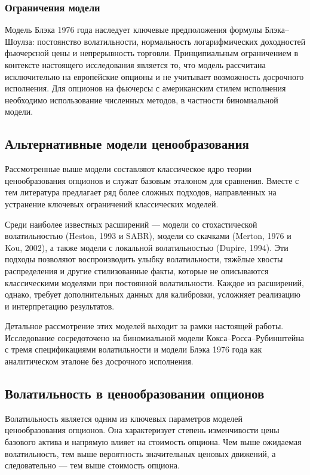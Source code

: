 \documentclass[11pt,a4paper]{article}
\begin{document}
\subsubsection{Ограничения модели}

Модель Блэка 1976 года наследует ключевые предположения формулы Блэка--Шоулза: постоянство волатильности, нормальность логарифмических доходностей фьючерсной цены и непрерывность торговли. Принципиальным ограничением в контексте настоящего исследования является то, что модель рассчитана исключительно на европейские опционы и не учитывает возможность досрочного исполнения. Для опционов на фьючерсы с американским стилем исполнения необходимо использование численных методов, в частности биномиальной модели.

\subsection{Альтернативные модели ценообразования}

Рассмотренные выше модели составляют классическое ядро теории ценообразования опционов и служат базовым эталоном для сравнения. Вместе с тем литература предлагает ряд более сложных подходов, направленных на устранение ключевых ограничений классических моделей.

Среди наиболее известных расширений --- модели со стохастической волатильностью (Heston, 1993 и SABR), модели со скачками (Merton, 1976 и Kou, 2002), а также модели с локальной волатильностью (Dupire, 1994). Эти подходы позволяют воспроизводить улыбку волатильности, тяжёлые хвосты распределения и другие стилизованные факты, которые не описываются классическими моделями при постоянной волатильности. Каждое из расширений, однако, требует дополнительных данных для калибровки, усложняет реализацию и интерпретацию результатов.

Детальное рассмотрение этих моделей выходит за рамки настоящей работы. Исследование сосредоточено на биномиальной модели Кокса--Росса--Рубинштейна с тремя спецификациями волатильности и модели Блэка 1976 года как аналитическом эталоне без досрочного исполнения.

\subsection{Волатильность в ценообразовании опционов}

Волатильность является одним из ключевых параметров моделей ценообразования опционов. Она характеризует степень изменчивости цены базового актива и напрямую влияет на стоимость опциона. Чем выше ожидаемая волатильность, тем выше вероятность значительных ценовых движений, а следовательно --- тем выше стоимость опциона.
\end{document}
